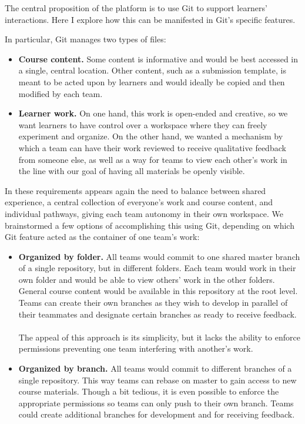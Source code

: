 \documentclass[12pt,twoside]{mitthesis}
\newcommand{\review}[1]{{#1}}
\begin{document}
\review{The central proposition of the platform is to use Git to support learners' interactions. Here I explore how this can be manifested in Git's specific features.

In particular, Git manages two types of files:
\begin{itemize}
 	\item \textbf{Course content.} Some content is informative and would be best accessed in a single, central location. Other content, such as a submission template, is meant to be acted upon by learners and would ideally be copied and then modified by each team.
 	\item \textbf{Learner work.} On one hand, this work is open-ended and creative, so we want learners to have control over a workspace where they can freely experiment and organize. On the other hand, we wanted a mechanism by which a team can have their work reviewed to receive qualitative feedback from someone else, as well as a way for teams to view each other's work in the line with our goal of having all materials be openly visible.
\end{itemize} 
In these requirements appears again the need to balance between shared experience, a central collection of everyone's work and course content, and individual pathways, giving each team autonomy in their own workspace. We brainstormed a few options of accomplishing this using Git, depending on which Git feature acted as the container of one team's work:
\begin{itemize}
\item \textbf{Organized by folder.} All teams would commit to one shared master branch of a single repository, but in different folders. Each team would work in their own folder and would be able to view others' work in the other folders. General course content would be available in this repository at the root level. Teams can create their own branches as they wish to develop in parallel of their teammates and designate certain branches as ready to receive feedback.\\ \\
The appeal of this approach is its simplicity, but it lacks the ability to enforce permissions preventing one team interfering with another's work.
\item \textbf{Organized by branch.} All teams would commit to different branches of a single repository. This way teams can rebase on master to gain access to new course materials. Though a bit tedious, it is even possible to enforce the appropriate permissions so teams can only push to their own branch. Teams could create additional branches for development and for receiving feedback.\\ \\

\end{itemize}}
\end{document}
